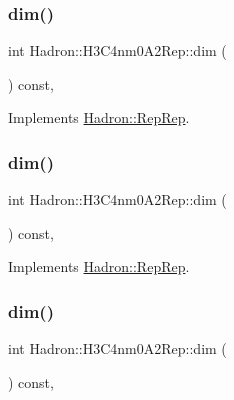 \subsubsection{\texorpdfstring{dim()}{dim()}\hspace{0.1cm}{\footnotesize\ttfamily [3/5]}}
{\footnotesize\ttfamily int Hadron\+::\+H3\+C4nm0\+A2\+Rep\+::dim (\begin{DoxyParamCaption}{ }\end{DoxyParamCaption}) const\hspace{0.3cm}{\ttfamily [inline]}, {\ttfamily [virtual]}}



Implements \mbox{\hyperlink{structHadron_1_1RepRep_a92c8802e5ed7afd7da43ccfd5b7cd92b}{Hadron\+::\+Rep\+Rep}}.

\mbox{\label{structHadron_1_1H3C4nm0A2Rep_a50d389ad6ec55078eb0fa7192883c1fa}} 
\subsubsection{\texorpdfstring{dim()}{dim()}\hspace{0.1cm}{\footnotesize\ttfamily [4/5]}}
{\footnotesize\ttfamily int Hadron\+::\+H3\+C4nm0\+A2\+Rep\+::dim (\begin{DoxyParamCaption}{ }\end{DoxyParamCaption}) const\hspace{0.3cm}{\ttfamily [inline]}, {\ttfamily [virtual]}}



Implements \mbox{\hyperlink{structHadron_1_1RepRep_a92c8802e5ed7afd7da43ccfd5b7cd92b}{Hadron\+::\+Rep\+Rep}}.

\mbox{\label{structHadron_1_1H3C4nm0A2Rep_a50d389ad6ec55078eb0fa7192883c1fa}} 
\subsubsection{\texorpdfstring{dim()}{dim()}\hspace{0.1cm}{\footnotesize\ttfamily [5/5]}}
{\footnotesize\ttfamily int Hadron\+::\+H3\+C4nm0\+A2\+Rep\+::dim (\begin{DoxyParamCaption}{ }\end{DoxyParamCaption}) const\hspace{0.3cm}{\ttfamily [inline]}, {\ttfamily [virtual]}}



